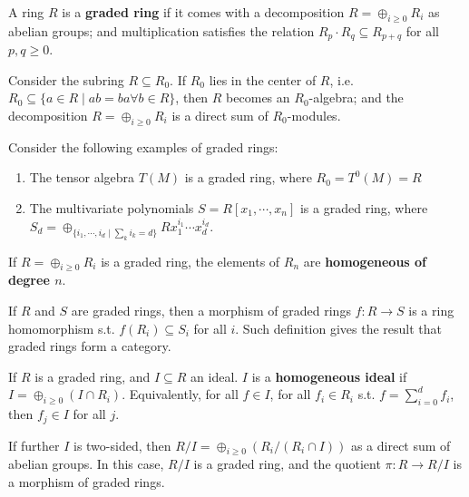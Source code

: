 \begin{definition}
    A ring $R$ is a \textbf{graded ring} if it comes with a decomposition $R = \oplus_{i \geq 0} R_i$ as abelian groups; and multiplication satisfies the relation $R_p \cdot R_q \subseteq R_{p + q}$ for all $p, q \geq 0$.
\end{definition}

\begin{remark}
    Consider the subring $R \subseteq R_0$. If $R_0$ lies in the center of $R$, i.e. $R_0 \subseteq \{a \in R \mid ab = ba \forall b \in R\}$, then $R$ becomes an $R_0$-algebra; and the decomposition $R = \oplus_{i \geq 0} R_i$ is a direct sum of $R_0$-modules.
\end{remark}

\begin{example}
    Consider the following examples of graded rings:
    \begin{enumerate}
        \item The tensor algebra $T(M)$ is a graded ring, where $R_0 = T^0(M) = R$
        \item The multivariate polynomials $S = R[x_1, \cdots, x_n]$ is a graded ring, where $S_d = \oplus_{\{i_1, \cdots, i_d \mid \sum_k i_k = d\}} R x_1^{i_1} \cdots x_d^{i_d}$.
    \end{enumerate}
\end{example}

\begin{definition}[Homogeneous]
    If $R = \oplus_{i \geq 0} R_i$ is a graded ring, the elements of $R_n$ are \textbf{homogeneous of degree $n$}.
\end{definition}

\begin{definition}
    If $R$ and $S$ are graded rings, then a morphism of graded rings $f: R \to S$ is a ring homomorphism s.t. $f(R_i) \subseteq S_i$ for all $i$. Such definition gives the result that graded rings form a category.
\end{definition}

\begin{definition}
    If $R$ is a graded ring, and $I \subseteq R$ an ideal. $I$ is a \textbf{homogeneous ideal} if $I = \oplus_{i \geq 0} (I \cap R_i)$. Equivalently, for all $f \in I$, for all $f_i \in R_i$ s.t. $f = \sum_{i=0}^d f_i$, then $f_j \in I$ for all $j$. 
\end{definition}

\begin{remark}
    If further $I$ is two-sided, then $R/I = \oplus_{i \geq 0}(R_i / (R_i \cap I))$ as a direct sum of abelian groups. In this case, $R/I$ is a graded ring, and the quotient $\pi: R \to R/I$ is a morphism of graded rings.
\end{remark}

